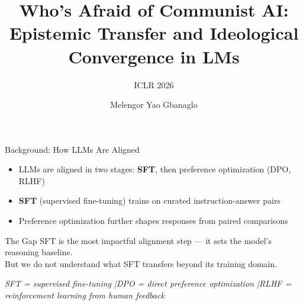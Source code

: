 \documentclass[aspectratio=169,12pt]{beamer}
\title{Who's Afraid of Communist AI:\\Epistemic Transfer and Ideological Convergence in LMs}
\subtitle{ICLR 2026}
\author{Melengor Yao Gbanaglo}
\institute{}
\date{}
\begin{document}
\maketitle
{}

\begin{frame}{Background: How LLMs Are Aligned}
  \begin{itemize}
    \item LLMs are aligned in two stages: \textbf{SFT}, then preference optimization (DPO, RLHF)
    \item \textbf{SFT} (supervised fine-tuning) trains on curated instruction-answer pairs
    \item Preference optimization further shapes responses from paired comparisons
  \end{itemize}

  \vspace{0.5em}
  \begin{alertblock}{The Gap}
    SFT is the most impactful alignment step --- it sets the model's reasoning baseline.\\
    But we do not understand what SFT transfers beyond its training domain.
  \end{alertblock}

  \vspace{0.3em}
  \small\textit{SFT = supervised fine-tuning \quad|\quad DPO = direct preference optimization \quad|\quad RLHF = reinforcement learning from human feedback}

\end{frame}
\end{document}
